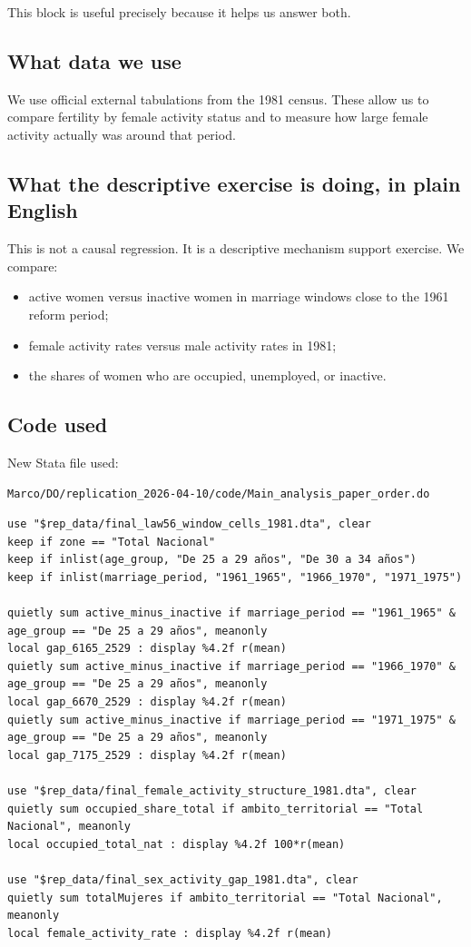 \documentclass[11pt]{article}
\begin{document}
This block is useful precisely because it helps us answer both.

\subsection*{What data we use}

We use official external tabulations from the 1981 census. These allow us to compare fertility by female activity status and to measure how large female activity actually was around that period.

\subsection*{What the descriptive exercise is doing, in plain English}

This is not a causal regression. It is a descriptive mechanism support exercise. We compare:
\begin{itemize}[leftmargin=*]
\item active women versus inactive women in marriage windows close to the 1961 reform period;
\item female activity rates versus male activity rates in 1981;
\item the shares of women who are occupied, unemployed, or inactive.
\end{itemize}

\subsection*{Code used}

New Stata file used:

\begin{verbatim}
Marco/DO/replication_2026-04-10/code/Main_analysis_paper_order.do
\end{verbatim}

\begin{verbatim}
use "$rep_data/final_law56_window_cells_1981.dta", clear
keep if zone == "Total Nacional"
keep if inlist(age_group, "De 25 a 29 años", "De 30 a 34 años")
keep if inlist(marriage_period, "1961_1965", "1966_1970", "1971_1975")

quietly sum active_minus_inactive if marriage_period == "1961_1965" & age_group == "De 25 a 29 años", meanonly
local gap_6165_2529 : display %4.2f r(mean)
quietly sum active_minus_inactive if marriage_period == "1966_1970" & age_group == "De 25 a 29 años", meanonly
local gap_6670_2529 : display %4.2f r(mean)
quietly sum active_minus_inactive if marriage_period == "1971_1975" & age_group == "De 25 a 29 años", meanonly
local gap_7175_2529 : display %4.2f r(mean)

use "$rep_data/final_female_activity_structure_1981.dta", clear
quietly sum occupied_share_total if ambito_territorial == "Total Nacional", meanonly
local occupied_total_nat : display %4.2f 100*r(mean)

use "$rep_data/final_sex_activity_gap_1981.dta", clear
quietly sum totalMujeres if ambito_territorial == "Total Nacional", meanonly
local female_activity_rate : display %4.2f r(mean)
\end{verbatim}
\end{document}
